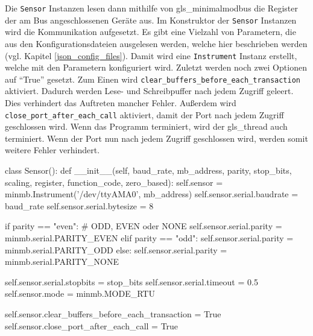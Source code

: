 Die \lstinline{Sensor} Instanzen lesen dann mithilfe von \gls{gls_minimalmodbus} die Register der am Bus angeschlossenen Geräte aus. Im Konstruktor der \lstinline{Sensor} Instanzen wird die Kommunikation aufgesetzt. Es gibt eine Vielzahl von Parametern, die aus den Konfigurationsdateien ausgelesen werden, welche hier beschrieben werden (vgl. Kapitel \ref{json_config_files}). Damit wird eine \lstinline{Instrument} Instanz erstellt, welche mit den Parametern konfiguriert wird. Zuletzt werden noch zwei Optionen auf \enquote{True} gesetzt. Zum Einen wird \lstinline{clear_buffers_before_each_transaction} aktiviert. Dadurch werden Lese- und Schreibpuffer nach jedem Zugriff geleert. Dies verhindert das Auftreten mancher Fehler. Außerdem wird \lstinline{close_port_after_each_call} aktiviert, damit der Port nach jedem Zugriff geschlossen wird. Wenn das Programm terminiert, wird der \gls{gls_thread} auch terminiert. Wenn der Port nun nach jedem Zugriff geschlossen wird, werden somit weitere Fehler verhindert.

\begin{pythoncode}
class Sensor():
	def __init__(self, baud_rate, mb_address, parity, stop_bits, scaling, register, function_code, zero_based):
		self.sensor = minmb.Instrument('/dev/ttyAMA0', mb_address)
		self.sensor.serial.baudrate = baud_rate
		self.sensor.serial.bytesize = 8
		
		if parity == "even":  # ODD, EVEN oder NONE
			self.sensor.serial.parity = minmb.serial.PARITY_EVEN
		elif parity == "odd":
			self.sensor.serial.parity = minmb.serial.PARITY_ODD
		else:
			self.sensor.serial.parity = minmb.serial.PARITY_NONE
		
		self.sensor.serial.stopbits = stop_bits
		self.sensor.serial.timeout = 0.5
		self.sensor.mode = minmb.MODE_RTU
		
		self.sensor.clear_buffers_before_each_transaction = True
		self.sensor.close_port_after_each_call = True
\end{pythoncode}

